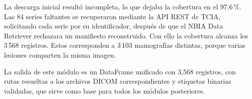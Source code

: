 La descarga inicial resultó incompleta, lo que dejaba la cobertura en el 97.6\,\%.
Las 84 series faltantes se recuperaron mediante la API REST de TCIA, solicitando
cada serie por su identificador, después de que el NBIA Data Retriever rechazara
un manifiesto reconstruido. Con ello la cobertura alcanza los 3\,568 registros.
Estos corresponden a 3\,103 mamografías distintas, porque varias lesiones
comparten la misma imagen.

La salida de este módulo es un DataFrame unificado con
3,568 registros, con rutas resueltas a los archivos DICOM
correspondientes y etiquetas binarias validadas, que sirve
como base para todos los módulos posteriores.

